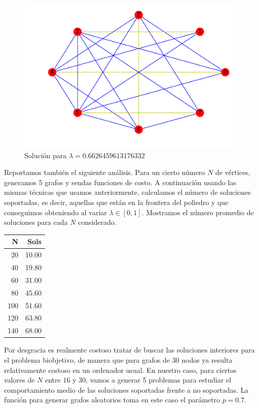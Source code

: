 \documentclass[twoside,a4paper,openright,12pt]{book}
\begin{document}
\begin{figure}[h!]
\centering
\includegraphics[scale=0.5]{opt4}
\caption{Solución para $\lambda=0.6626459613176332$}
\end{figure}
\newpage
Reportamos también el siguiente análisis. Para un cierto número $N$ de vértices, generamos 5 grafos y sendas funciones de costo. A continuación usando las mismas técnicas que usamos anteriormente, calculamos el número de soluciones soportadas, es decir, aquellas que están en la frontera del poliedro y que conseguimos obteniendo al variar $\lambda \in [0,1]$. Mostramos el número promedio de soluciones para cada $N$ considerado.
\begin{table}[ht]
\centering
\begin{tabular}{rr}
  \hline
  N & Sols \\ 
  \hline
20 & 10.00 \\ 
40 & 19.80 \\ 
60 & 31.00 \\ 
80 & 45.60 \\ 
100 & 51.60 \\ 
120 & 63.80 \\ 
140 & 68.00 \\ 
   \hline
\end{tabular}
\end{table}

Por desgracia es realmente costoso tratar de buscar las soluciones interiores para el problema biobjetivo, de manera que para grafos de 30 nodos ya resulta relativamente costoso en un ordenador usual. En nuestro caso, para ciertos valores de $N$ entre $16$ y $30$, vamos a generar 5 problemas para estudiar el comportamiento medio de las soluciones soportadas frente a no soportadas. La función para generar grafos aleatorios toma en este caso el parámetro $p=0.7$. 
\end{document}
